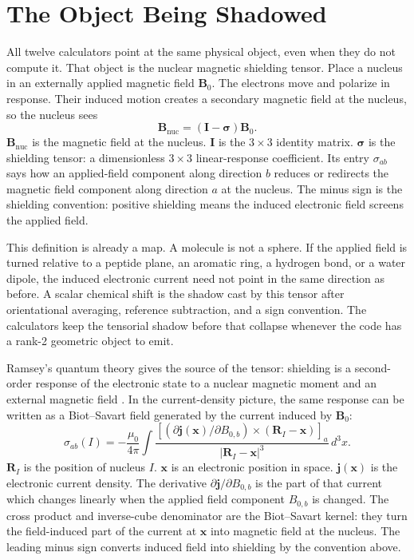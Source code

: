 \documentclass[11pt]{article}
\newcommand{\dd}{\,d}
\begin{document}
\tableofcontents
\clearpage

\section{The Object Being Shadowed}

All twelve calculators point at the same physical object, even when they do not
compute it. That object is the nuclear magnetic shielding tensor. Place a
nucleus in an externally applied magnetic field \(\bm B_0\). The electrons move
and polarize in response. Their induced motion creates a secondary magnetic
field at the nucleus, so the nucleus sees
\[
  \bm B_{\mathrm{nuc}}=(\bm I-\bm\sigma)\bm B_0 .
\]
\(\bm B_{\mathrm{nuc}}\) is the magnetic field at the nucleus. \(\bm I\) is
the \(3\times3\) identity matrix. \(\bm\sigma\) is the shielding tensor: a
dimensionless \(3\times3\) linear-response coefficient. Its entry
\(\sigma_{ab}\) says how an applied-field component along direction \(b\)
reduces or redirects the magnetic field component along direction \(a\) at the
nucleus. The minus sign is the shielding convention: positive shielding means
the induced electronic field screens the applied field.

This definition is already a map. A molecule is not a sphere. If the applied
field is turned relative to a peptide plane, an aromatic ring, a hydrogen bond,
or a water dipole, the induced electronic current need not point in the same
direction as before. A scalar chemical shift is the shadow cast by this tensor
after orientational averaging, reference subtraction, and a sign convention. The
calculators keep the tensorial shadow before that collapse whenever the code has
a rank-2 geometric object to emit.

Ramsey's quantum theory gives the source of the tensor: shielding is a
second-order response of the electronic state to a nuclear magnetic moment and
an external magnetic field \cite{ramsey1950,facelli2011}. In the current-density
picture, the same response can be written as a Biot--Savart field generated by
the current induced by \(\bm B_0\):
\[
  \sigma_{ab}(I)
  =
  -\frac{\mu_0}{4\pi}
  \int
  \frac{
    \left[
      \left(\partial \bm j(\bm x)/\partial B_{0,b}\right)
      \times
      (\bm R_I-\bm x)
    \right]_a
  }
  {|\bm R_I-\bm x|^3}
  \dd^3 x .
\]
\(\bm R_I\) is the position of nucleus \(I\). \(\bm x\) is an electronic
position in space. \(\bm j(\bm x)\) is the electronic current density. The
derivative \(\partial \bm j/\partial B_{0,b}\) is the part of that current
which changes linearly when the applied field component \(B_{0,b}\) is changed.
The cross product and inverse-cube denominator are the Biot--Savart kernel:
they turn the field-induced part of the current at \(\bm x\) into magnetic
field at the nucleus. The leading
minus sign converts induced field into shielding by the convention above.
\end{document}
